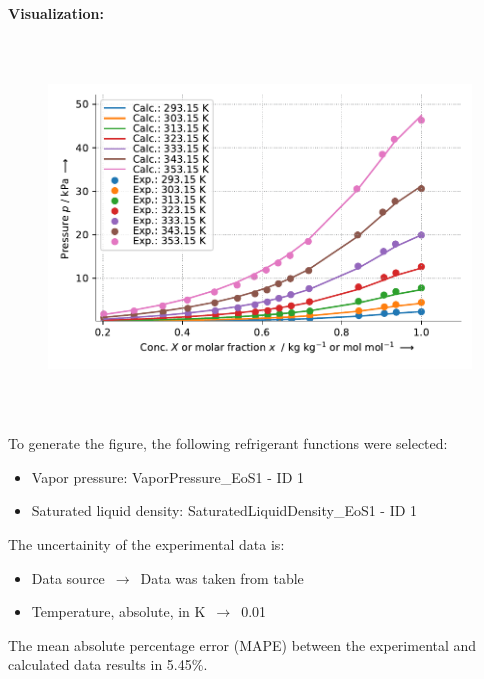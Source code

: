\textbf{Visualization:}
%
\begin{figure}[!htp]
{\noindent\includegraphics[height=10cm, keepaspectratio]{figs/abs/abs_Water_ionic_liquid_[DEMA][OMs]_NrtlFixedDg_1.pdf}}
\end{figure}
%

To generate the figure, the following refrigerant functions were selected:
\begin{itemize}
\item Vapor pressure: VaporPressure\_EoS1 - ID 1
\item Saturated liquid density: SaturatedLiquidDensity\_EoS1 - ID 1
\end{itemize}

The uncertainity of the experimental data is:
\begin{itemize}
\item Data source $\,\to\,$ Data was taken from table
\item Temperature, absolute, in $\si{\kelvin}$ $\,\to\,$ 0.01
\end{itemize}

The mean absolute percentage error (MAPE) between the experimental and calculated data results in 5.45\%.
\FloatBarrier
\newpage
